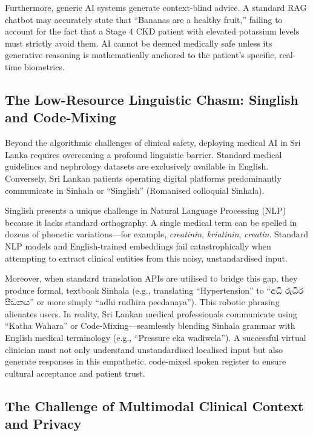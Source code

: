 \documentclass[12pt,a4paper]{report}
\begin{document}
Furthermore, generic AI systems generate context-blind advice. A standard RAG chatbot may accurately state that ``Bananas are a healthy fruit,'' failing to account for the fact that a Stage 4 CKD patient with elevated potassium levels must strictly avoid them. AI cannot be deemed medically safe unless its generative reasoning is mathematically anchored to the patient's specific, real-time biometrics.

\subsection{The Low-Resource Linguistic Chasm: Singlish and Code-Mixing}

Beyond the algorithmic challenges of clinical safety, deploying medical AI in Sri Lanka requires overcoming a profound linguistic barrier. Standard medical guidelines and nephrology datasets are exclusively available in English. Conversely, Sri Lankan patients operating digital platforms predominantly communicate in Sinhala or ``Singlish'' (Romanised colloquial Sinhala).

Singlish presents a unique challenge in Natural Language Processing (NLP) because it lacks standard orthography. A single medical term can be spelled in dozens of phonetic variations---for example, \textit{creatinin}, \textit{kriatinin}, \textit{creatin}. Standard NLP models and English-trained embeddings fail catastrophically when attempting to extract clinical entities from this noisy, unstandardised input.

Moreover, when standard translation APIs are utilised to bridge this gap, they produce formal, textbook Sinhala (e.g., translating ``Hypertension'' to ``අධි රුධිර පීඩනය'' or more simply ``adhi rudhira peedanaya''). This robotic phrasing alienates users. In reality, Sri Lankan medical professionals communicate using ``Katha Wahara'' or Code-Mixing---seamlessly blending Sinhala grammar with English medical terminology (e.g., ``Pressure eka wadiwela''). A successful virtual clinician must not only understand unstandardised localised input but also generate responses in this empathetic, code-mixed spoken register to ensure cultural acceptance and patient trust.

\subsection{The Challenge of Multimodal Clinical Context and Privacy}
\end{document}
